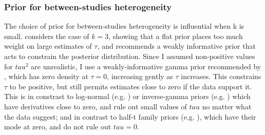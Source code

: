 \subsubsection{Prior for between-studies heterogeneity}

The choice of prior for between-studies heterogeneity is influential when k is small\autocite{seide2019LikelihoodbasedRandomeffectsMetaanalysis}.
\autocite{gelman2006PriorDistributionsVariance} considers the case of $k=3$, showing that a flat prior places too much weight on large estimates of $\tau$, and recommends a weakly informative prior that acts to constrain the posterior distribution.
%
%
Since I assumed non-positive values for $tau^2$ are unrealistic, I use a weakly-informative gamma prior recommended by \autocite{chung2013NondegeneratePenalizedLikelihood}, which has zero density at $\tau = 0$, increasing gently as $\tau$ increases.
This constrains $\tau$ to be positive, but still permits estimates close to zero if the data support it.
This is in constrast to log-normal (e.g. \autocite{pullenayegum2011InformedReferencePrior,turner2015PredictiveDistributionsBetweenstudy}) or inverse-gamma priors (e.g. \autocite{higgins1996BorrowingStrengthExternal}) which have derivatives close to zero, and rule out small values of $tau$ no matter what the data suggest; and in contrast to half-t family priors (e.g. \autocite{gelman2006PriorDistributionsVariance,seide2019LikelihoodbasedRandomeffectsMetaanalysis}), which have their mode at zero, and do not rule out $tau=0$.

